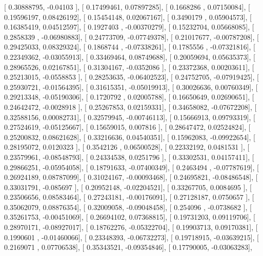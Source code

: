 \documentclass{article}
\begin{document}
       [ 0.30888795, -0.04103   ],
       [ 0.17499461,  0.07897285],
       [ 0.1668286 ,  0.07150084],
       [ 0.19596197,  0.08426192],
       [ 0.15454148,  0.02067167],
       [ 0.3490179 ,  0.05904573],
       [ 0.16385419,  0.04512597],
       [ 0.1927403 , -0.00370279],
       [ 0.15232704,  0.05668085],
       [ 0.2858339 , -0.06980883],
       [ 0.24773709, -0.07749378],
       [ 0.21017677, -0.00787208],
       [ 0.29425033,  0.08329324],
       [ 0.1868744 , -0.07338261],
       [ 0.1785556 , -0.07321816],
       [ 0.22349362, -0.03055913],
       [ 0.33469464,  0.08749688],
       [ 0.20059694,  0.05635373],
       [ 0.28965526,  0.02167851],
       [ 0.31304167, -0.0352086 ],
       [ 0.23372368,  0.00203611],
       [ 0.25213015, -0.0558853 ],
       [ 0.28253635, -0.06402523],
       [ 0.24752705, -0.07919425],
       [ 0.25930721, -0.01564395],
       [ 0.31615351, -0.05019913],
       [ 0.30026636,  0.00760349],
       [ 0.29213348, -0.05190306],
       [ 0.1720792 ,  0.02005788],
       [ 0.16650649,  0.02690651],
       [ 0.24642472, -0.0028918 ],
       [ 0.25267853,  0.02159331],
       [ 0.34658082, -0.07672208],
       [ 0.32588156,  0.00082731],
       [ 0.32579945, -0.00746113],
       [ 0.15666913,  0.09793319],
       [ 0.27524619, -0.05125667],
       [ 0.15659015,  0.007816  ],
       [ 0.28647472,  0.02524824],
       [ 0.25200832,  0.08621628],
       [ 0.33216636,  0.04540351],
       [ 0.15962083, -0.09922654],
       [ 0.28195072,  0.0120323 ],
       [ 0.3542126 ,  0.06500528],
       [ 0.22332192,  0.0481531 ],
       [ 0.23579961, -0.08548793],
       [ 0.24334538,  0.0251796 ],
       [ 0.33302531,  0.04157411],
       [ 0.29866251, -0.05954058],
       [ 0.18791633, -0.07400349],
       [ 0.2463494 , -0.07787619],
       [ 0.26924189,  0.08787099],
       [ 0.31024167, -0.00093468],
       [ 0.24695821, -0.08486548],
       [ 0.33031791, -0.085697  ],
       [ 0.20952148, -0.02204521],
       [ 0.33267705,  0.0084695 ],
       [ 0.23506656,  0.08583464],
       [ 0.27243181, -0.00176091],
       [ 0.27128187,  0.0750657 ],
       [ 0.35062079,  0.08876354],
       [ 0.32009058, -0.09048458],
       [ 0.254096  , -0.0738682 ],
       [ 0.35261753, -0.00451069],
       [ 0.26694102,  0.07368815],
       [ 0.19731203,  0.09119706],
       [ 0.28970171, -0.08927017],
       [ 0.18762276, -0.05322704],
       [ 0.19903713,  0.09170381],
       [ 0.1990601 , -0.01460066],
       [ 0.23348393, -0.06732273],
       [ 0.19718915, -0.03639215],
       [ 0.2169071 ,  0.07706538],
       [ 0.35343521, -0.09354846],
       [ 0.17790005, -0.03063283],
\end{document}
